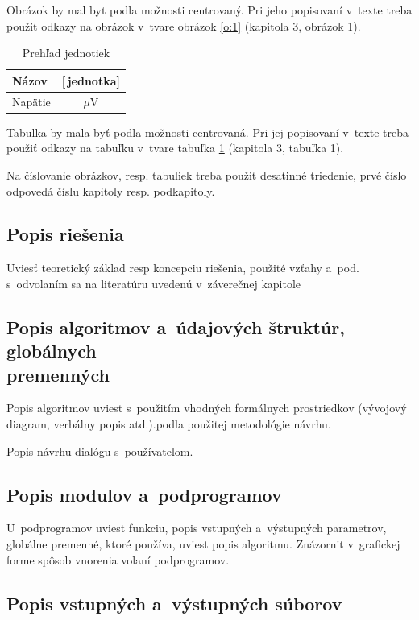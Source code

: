 \documentclass[a4paper]{feidipsp}
\begin{document}
Obrázok by mal byt podla možnosti centrovaný. Pri jeho popisovaní v~texte treba použit odkazy na obrázok v~tvare obrázok \ref{o:1}  (kapitola 3, obrázok 1).

\begin{table}[!ht]\caption{Prehľad jednotiek}\label{t:1}
\smallskip
\centering
\begin{tabular}{|l|c|} \hline
Názov	& [\,jednotka] \\ \hline
Napätie & $\mu$V \\ \hline
\end{tabular}	
\end{table}


Tabulka by mala byť podla možnosti centrovaná. Pri jej popisovaní v~texte treba použiť odkazy na tabuľku v~tvare tabuľka \ref{t:1} (kapitola 3, tabuľka 1).

Na číslovanie obrázkov, resp. tabuliek treba použit desatinné triedenie, prvé číslo odpovedá číslu kapitoly resp. podkapitoly.


\subsection{Popis riešenia}

Uviesť teoretický základ resp koncepciu riešenia, použité vzťahy a~pod. s~odvolaním sa na literatúru uvedenú v~záverečnej kapitole

\subsection[Popis  algoritmov a~údajových štruktúr, globálnych premenných]{Popis  algoritmov a~údajových štruktúr, globálnych\\ premenných}

Popis algoritmov uviest s~použitím vhodných formálnych prostriedkov (vývojový diagram, verbálny popis atd.).podla použitej metodológie návrhu.

Popis návrhu dialógu s~používatelom. 

\subsection{Popis modulov a~podprogramov}

U~podprogramov uviest funkciu, popis vstupných a~výstupných parametrov, globálne premenné, ktoré používa, uviest popis algoritmu. Znázornit v~grafickej forme spôsob vnorenia volaní podprogramov.

\subsection{Popis vstupných a~výstupných súborov}
\end{document}
